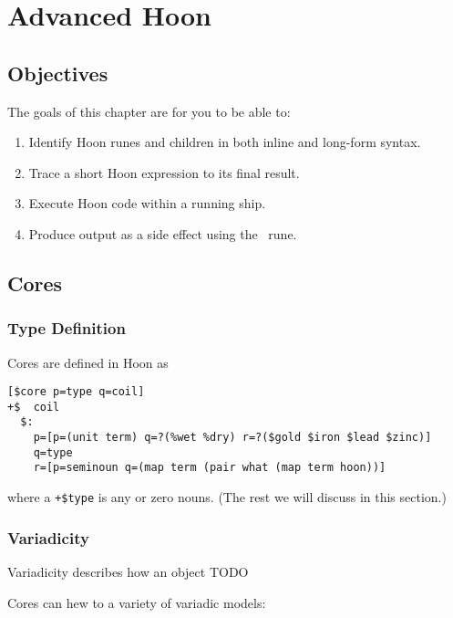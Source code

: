 \setchapterpreamble[u]{\margintoc}
\chapter{Advanced Hoon}

\section{Objectives}

The goals of this chapter are for you to be able to:

\begin{enumerate}
  \item  Identify Hoon runes and children in both inline and long-form syntax.
  \item  Trace a short Hoon expression to its final result.
  \item  Execute Hoon code within a running ship.
  \item  Produce output as a side effect using the \sigpam~rune.
\end{enumerate}

\section{Cores}

\subsection{Type Definition}

Cores are defined in Hoon as

\begin{lstlisting}
[$core p=type q=coil]
+$  coil
  $:
    p=[p=(unit term) q=?(%wet %dry) r=?($gold $iron $lead $zinc)]
    q=type
    r=[p=seminoun q=(map term (pair what (map term hoon))]
\end{lstlisting}

where a \texttt{+\$type} is any or zero nouns.  (The rest we will discuss in this section.)

\subsection{Variadicity}

Variadicity describes how an object TODO

Cores can hew to a variety of variadic models:

